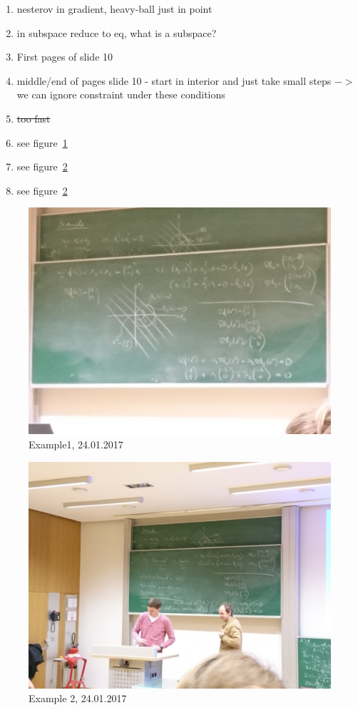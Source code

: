 \documentclass{report}
\begin{document}
\begin{enumerate}
\item nesterov in gradient, heavy-ball just in point
\item in subspace reduce to eq, what is a subspace?
\item First pages of slide 10
\item middle/end of pages slide 10 - start in interior and just take small steps $->$ we can ignore constraint under these conditions
\item \sout{too fast}
\item see figure~\ref{fig:ex1}

\item see figure~\ref{fig:ex2}

\item see figure~\ref{fig:ex2}


\end{enumerate}
\begin{figure}[H]
\includegraphics[width=\textwidth]{2017_01_24-ex1.jpg}
\caption{Example1,  24.01.2017\label{fig:ex1}}
\end{figure}

\begin{figure}[H]
\includegraphics[width=\textwidth]{2017_01_24-ex2.jpg}
\caption{Example 2,  24.01.2017\label{fig:ex2}}
\end{figure}
\end{document}
